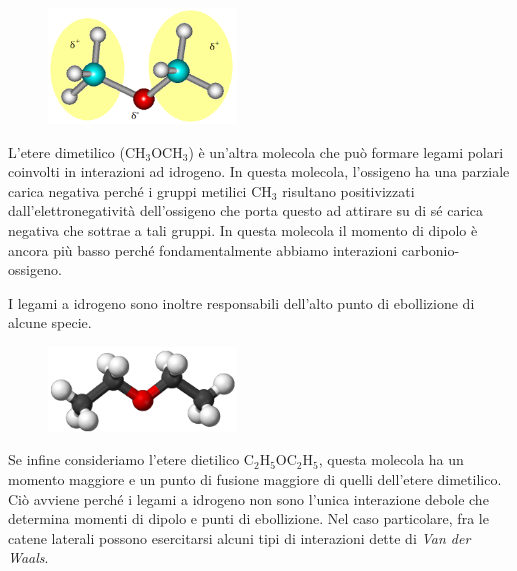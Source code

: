 \hspace{0.5cm}\begin{minipage}{0.35 \textwidth}
    \begin{figure}[H]
        \includegraphics[width=5cm]{immagini/etere_dimetilico.png}
    \end{figure}
\end{minipage}
\begin{minipage}{0.6 \textwidth}
    \vspace{0.6cm}L'etere dimetilico (CH$_3$OCH$_3$) è un'altra molecola che può formare legami polari coinvolti in interazioni ad idrogeno. In questa molecola, l'ossigeno ha una parziale carica negativa perché i gruppi metilici CH$_3$ risultano positivizzati dall'elettronegatività dell'ossigeno che porta questo ad attirare su di sé carica negativa che sottrae a tali gruppi. In questa molecola il momento di dipolo è ancora più basso perché fondamentalmente abbiamo interazioni carbonio-ossigeno.
\end{minipage}

\vspace{0.2cm}I legami a idrogeno sono inoltre responsabili dell'alto punto di ebollizione di alcune specie.

\hspace{0.5cm}\begin{minipage}{0.35 \textwidth}
    \begin{figure}[H]
        \includegraphics[width=5cm]{immagini/etere_dietilico.png}
    \end{figure}
\end{minipage}
\begin{minipage}{0.6 \textwidth}
    \vspace{0.6cm}Se infine consideriamo l'etere dietilico C$_2$H$_5$OC$_2$H$_5$, questa molecola ha un momento maggiore e un punto di fusione maggiore di quelli dell'etere dimetilico. Ciò avviene perché i legami a idrogeno non sono l'unica interazione debole che determina momenti di dipolo e punti di ebollizione. Nel caso particolare, fra le catene laterali possono esercitarsi alcuni tipi di interazioni dette di \textit{Van der Waals}.
\end{minipage}

